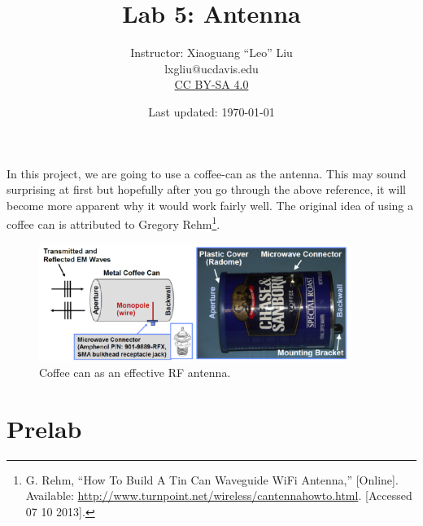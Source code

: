 \documentclass[letterpaper, 11pt]{article}
\begin{document}
\title{Lab 5: Antenna}
\author{Instructor: Xiaoguang ``Leo'' Liu\\lxgliu@ucdavis.edu \\
	\small \href{http://creativecommons.org/licenses/by-sa/4.0/}{CC BY-SA 4.0}}
\date{Last updated: \today}

\maketitle

In this project, we are going to use a coffee-can as the antenna. This may sound surprising at first but hopefully after you go through the above reference, it will become more apparent why it would work fairly well. The original idea of using a coffee can is attributed to Gregory Rehm\footnote{G. Rehm, ``How To Build A Tin Can Waveguide WiFi Antenna,'' [Online]. Available: \url{http://www.turnpoint.net/wireless/cantennahowto.html}. [Accessed 07 10 2013].}. 

	\begin{figure}[ht]
		\centering	
		\includegraphics[width=4in]{coffee-can}
		\caption{Coffee can as an effective RF antenna.}
		\label{fig:coffee-can}
	\end{figure}
		
		
%


\section{Prelab}
\end{document}
